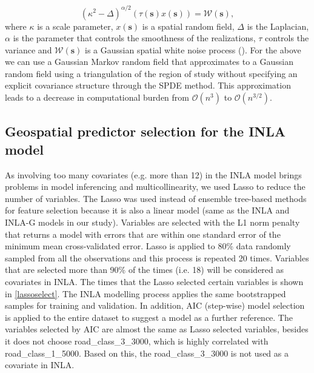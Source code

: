 \documentclass{article}
\begin{document}
\begin{equation}\label{eqn:eq9}
(\kappa^{2} - \Delta)^{\alpha/2}(\tau(\boldsymbol{s}) x(\boldsymbol{s})) = \boldsymbol{\mathcal{W}(s)},
\end{equation}
where $\kappa$ is a scale parameter, $x(\boldsymbol{s})$ is a spatial random field, $\Delta$ is the Laplacian, $\alpha$ is the parameter that controls the smoothness of the realizations, $\tau$ controls the variance and $\boldsymbol{\mathcal{W}(s)}$  is a Gaussian spatial white noise process (\cite{lindgren2015bayesian}). For the above we can use a Gaussian Markov random field that approximates to a Gaussian random field using a triangulation of the region of study without specifying an explicit covariance structure through the SPDE method. This approximation leads to a decrease in computational burden from $\mathcal{O}(n^{3})$ to $\mathcal{O}(n^{3/2})$. 



\subsection{Geospatial predictor selection for the INLA model} 

As involving too many covariates (e.g. more than 12) in the INLA model brings problems in model inferencing and multicollinearity, we used Lasso to reduce the number of variables. The Lasso was used instead of ensemble tree-based methods for feature selection because it is also a linear model (same as the INLA and INLA-G models in our study). Variables are selected with the L1 norm penalty that returns a model with errors that are within one standard error of the minimum mean cross-validated error. Lasso is applied to 80\% data randomly sampled from all the observations and this process is repeated  20 times. Variables that are selected more than 90\% of the times (i.e. 18) will be considered as covariates in INLA. The times that the Lasso selected certain variables is shown in \cref{lassoselect}. The INLA modelling process applies the same bootstrapped samples for training and validation.  In addition, AIC (step-wise) model selection is applied to the entire dataset to suggest a model as a further reference. The variables selected by AIC are almost the same as Lasso selected variables, besides it does not choose road\_class\_3\_3000, which is highly correlated with  road\_class\_1\_5000. Based on this, the road\_class\_3\_3000 is not used as a covariate in INLA.  
\end{document}
